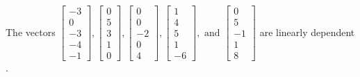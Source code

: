 \begin{exercise}
\begin{exerciseStatement}
  \end{exerciseStatement}
  \begin{exerciseAnswer}
   The vectors \(\left[\begin{array}{r}
-3 \\
0 \\
-3 \\
-4 \\
-1
\end{array}\right] , \left[\begin{array}{r}
0 \\
5 \\
3 \\
1 \\
0
\end{array}\right] , \left[\begin{array}{r}
0 \\
0 \\
-2 \\
0 \\
4
\end{array}\right] , \left[\begin{array}{r}
1 \\
4 \\
5 \\
1 \\
-6
\end{array}\right] , \text{ and } \left[\begin{array}{r}
0 \\
5 \\
-1 \\
1 \\
8
\end{array}\right]\) are 
  	 linearly dependent  .
  


  \end{exerciseAnswer}
\end{exercise}